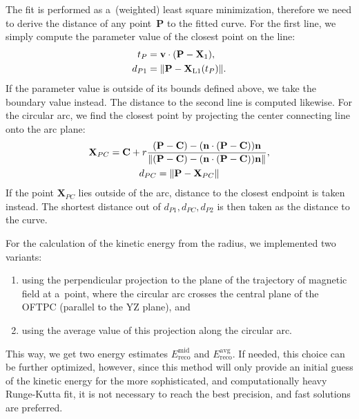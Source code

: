 			The fit is performed as a~(weighted) least square minimization, therefore we need to derive the distance of any point~$\mathbf{P}$ to the fitted curve. For the first line, we simply compute the parameter value of the closest point on the line:
				\begin{equation}
					\label{eq:segdist}
					\begin{aligned}
						t_P &= \mathbf{v}\cdot(\mathbf{P}-\mathbf{X}_1),\\
						d_{P1} &= \norm{\mathbf{P}-\mathbf{X}_\text{L1}(t_P)}.
					\end{aligned}
				\end{equation}
			If the parameter value is outside of its bounds defined above, we take the boundary value instead. The distance to the second line is computed likewise. For the circular arc, we find the closest point by projecting the center connecting line onto the arc plane:
				\begin{gather}
					\mathbf{X}_{PC} = \mathbf{C} + r\frac{(\mathbf{P}-\mathbf{C})-(\mathbf{n}\cdot(\mathbf{P}-\mathbf{C}))\mathbf{n}}{\norm{(\mathbf{P}-\mathbf{C})-(\mathbf{n}\cdot(\mathbf{P}-\mathbf{C}))\mathbf{n}}},\\
					d_{PC} = \norm{\mathbf{P}-\mathbf{X}_{PC}}
				\end{gather}
			If the point $\mathbf{X}_{PC}$ lies outside of the arc, distance to the closest endpoint is taken instead. The shortest distance out of $d_{P1},d_{PC},d_{P2}$ is then taken as the distance to the curve.
			
			For the calculation of the kinetic energy from the radius, we implemented two variants:
				\begin{enumerate}[nosep]
				 	\item using the perpendicular projection to the plane of the trajectory of magnetic field at a~point, where the circular arc crosses the central plane of the \ac{OFTPC} (parallel to the YZ plane), and
				 	\item using the average value of this projection along the circular arc.
				\end{enumerate}
			This way, we get two energy estimates $E_{\text{reco}}^{\text{mid}}$ and $E_{\text{reco}}^{\text{avg}}$. If needed, this choice can be further optimized, however, since this method will only provide an initial guess of the kinetic energy for the more sophisticated, and computationally heavy Runge-Kutta fit, it is not necessary to reach the best precision, and fast solutions are preferred.
			
